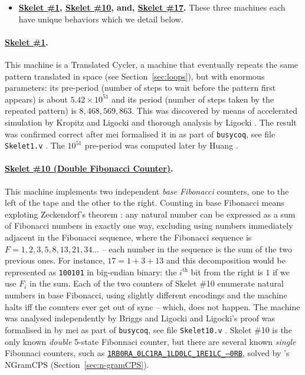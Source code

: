 \begin{itemize}
    \item \textbf{\href{https://bbchallenge.org/1RB1RD_1LC0RC_1RA1LD_0RE0LB_---1RC}{Skelet \#1}, \href{https://bbchallenge.org/1RB0RA_0LC1RA_1RE1LD_1LC0LD_---0RB}{Skelet \#10}, and, \href{https://bbchallenge.org/1RB---_0LC1RE_0LD1LC_1RA1LB_0RB0RA}{Skelet \#17}.} These three machines each have unique behaviors which we detail below.
\end{itemize}

\paragraph{\href{https://bbchallenge.org/1RB1RD_1LC0RC_1RA1LD_0RE0LB_---1RC}{Skelet \#1}.} This machine is a Translated Cycler, \ie a machine that eventually repeats the same pattern translated in space (see Section~\ref{sec:loops}), but with enormous parameters: its pre-period (number of steps to wait before the pattern first appears) is about $5.42 \times 10^{51}$ and its period (number of steps taken by the repeated pattern) is $8,468,569,863$. This was discovered by means of accelerated simulation by Kropitz and Ligocki \cite{uniSk1} and thorough analysis by Ligocki \cite{ShawnSkelet1Before, ShawnSkelet1}. The result was confirmed correct after mei formalised it in \Coq as part of \texttt{busycoq}, see file \texttt{Skelet1.v} \cite{busycoq}. The $10^{51}$ pre-period was computed later by Huang \cite{hipparcosSk1}.

\paragraph{\href{https://bbchallenge.org/1RB0RA_0LC1RA_1RE1LD_1LC0LD_---0RB}{Skelet \#10 (Double Fibonacci Counter)}.} This machine implements two independent \textit{base Fibonacci} counters, one to the left of the tape and the other to the right. Counting in base Fibonacci means exploting Zeckendorf's theorem \cite{wiki:Zeckendorf's_theorem}: any natural number can be expressed as a sum of Fibonacci numbers in exactly one way, excluding using numbers immediately adjacent in the Fibonacci sequence, where the Fibonacci sequence is $F = 1,2,3,5,8,13,21,34\dots$ -- each number in the sequence is the sum of the two previous ones. For instance, $17 = 1 + 3 + 13$ and this decomposition would be represented as \texttt{100101} in big-endian binary: the $i^\text{th}$ bit from the right is $1$ if we use $F_i$ in the sum. Each of the two counters of Skelet \#10 enumerate natural numbers in base Fibonacci, using slightly different encodings and the machine halts iff the counters ever get out of sync -- which, does not happen. The machine was analysed independently by Briggs and Ligocki \cite{DanBriggs,ShawnSkelet10} and Ligocki's proof \cite{ShawnSkelet10} was formalised in \Coq by mei as part of \texttt{busycoq}, see file \texttt{Skelet10.v} \cite{busycoq}. Skelet \#10 is the only known \textit{double} 5-state Fibonnaci counter, but there are several known \textit{single} Fibonnaci counters, such as \href{https://bbchallenge.org/1RB0RA_0LC1RA_1LD0LC_1RE1LC_---0RB}{\texttt{1RB0RA\_0LC1RA\_1LD0LC\_1RE1LC\_---0RB}}, solved by \CoqBB's NGramCPS (Section~\ref{sec:n-gramCPS}).

